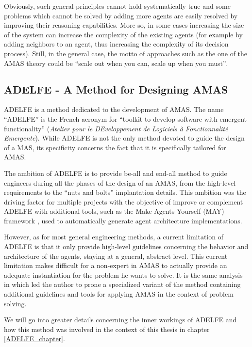 Obviously, such general principles cannot hold systematically true and some problems which cannot be solved by adding more agents are easily resolved by improving their reasoning capabilities. More so, in some cases increasing the size of the system can increase the complexity of the existing agents (for example by adding neighbors to an agent, thus increasing the complexity of its decision process). Still, in the general case, the motto of approaches such as the one of the AMAS theory could be \enquote{scale out when you can, scale up when you must}. 

\subsection{ADELFE - A Method for Designing AMAS}\label{AMAS-ADELFE}

ADELFE \cite{bernon2003adelfe} is a method dedicated to the development of AMAS. The name \enquote{ADELFE} is the French acronym for \enquote{toolkit to develop software with emergent functionality} (\textit{Atelier pour le DEveloppement de Logiciels à Fonctionnalité Emergente}). While ADELFE is not the only method devoted to guide the design of a MAS, its specificity concerns the fact that it is specifically tailored for AMAS.

The ambition of ADELFE is to provide be-all and end-all method to guide engineers during all the phases of the design of an AMAS, from the high-level requirements to the \enquote{nuts and bolts} implantation details. This ambition was the driving factor for multiple projects with the objective of improve or complement ADELFE with additional tools, such as the Make Agents Yourself (MAY) framework  \cite{No2012.2}, used to automatically generate agent architecture implementations.

However, as for most general engineering methods, a current limitation of ADELFE is that it only provide high-level guidelines concerning the behavior and architecture of the agents, staying at a general, abstract level. This current limitation makes difficult for a non-expert in AMAS to actually provide an adequate instantiation for the problem he wants to solve. It is the same analysis in \cite{Ka2011.6} which led the author to prone a specialized variant of the method containing additional guidelines and tools for applying AMAS in the context of problem solving.

We will go into greater details concerning the inner workings of ADELFE and how this method was involved in the context of this thesis in chapter \ref{ADELFE_chapter}.

